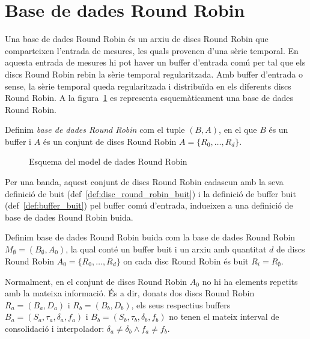 {\section{Base de dades Round Robin}\label{sec:model:rrd}

Una base de dades Round Robin és un arxiu de discs Round Robin que comparteixen l'entrada de mesures, les quals provenen d'una sèrie temporal. En aquesta entrada de mesures hi pot haver un buffer d'entrada comú per tal que els discs Round Robin rebin la sèrie temporal regularitzada. Amb buffer d'entrada o sense, la sèrie temporal queda regularitzada i distribuïda en els diferents discs Round Robin. A la figura~\ref{fig:model:esquemarrd} es representa esquemàticament una base de dades Round Robin.

\begin{definition}
  Definim \emph{base de dades Round Robin} com el tuple $(B,A)$, en el
  que $B$ és un buffer i $A$ és un conjunt de discs Round Robin
  $A=\{R_0,\ldots,R_d\}$.
\end{definition}


\begin{figure}[htp]
\centering
\setlength{\unitlength}{0.4mm}

\caption{Esquema del model de dades Round Robin}
\label{fig:model:esquemarrd}
\end{figure}


Per una banda, aquest conjunt de discs Round Robin cadascun amb la
seva definició de buit (def~\ref{def:disc_round_robin_buit}) i
la definició de buffer buit (def~\ref{def:buffer_buit}) pel buffer comú
d'entrada, indueixen a una definició de base de dades Round Robin
buida.

\begin{definition}
  Definim base de dades Round Robin buida com la base de dades Round
  Robin $M_{\emptyset} = (B_{\emptyset},A_0)$, la qual conté un buffer
  buit i un arxiu amb quantitat $d$ de discs Round Robin $A_0 =
  \{R_0,\ldots,R_d\}$ on cada disc Round Robin és buit
  $R_i=R_{\emptyset}$.
\end{definition}

Normalment, en el conjunt de discs Round Robin $A_0$ no hi ha elements
repetits amb la mateixa informació. És a dir, donats dos discs Round
Robin $R_a = (B_a, D_a)$ i $R_b = (B_b, D_b)$, els seus respectius
buffers $B_a=(S_a,\tau_a,\delta_a,f_a)$ i
$B_b=(S_b,\tau_b,\delta_b,f_b)$ no tenen el mateix interval de
consolidació i interpolador: $\delta_a \neq \delta_b \wedge f_a \neq
f_b$. 



}
